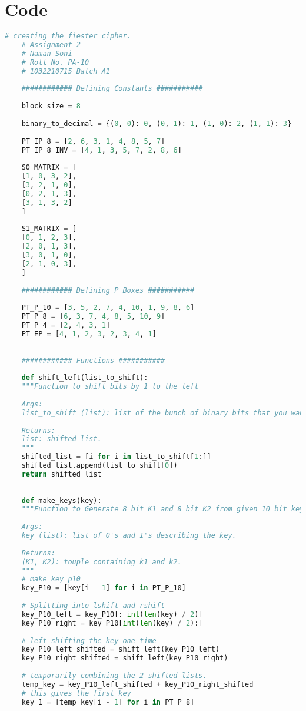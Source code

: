 \documentclass{article}
\begin{document}
\section{\textbf{Code}}
\begin{lstlisting}[language=python, caption={Input Code}]
	# creating the fiester cipher.
	# Assignment 2
	# Naman Soni
	# Roll No. PA-10
	# 1032210715 Batch A1
	
	############ Defining Constants ###########
	
	block_size = 8
	
	binary_to_decimal = {(0, 0): 0, (0, 1): 1, (1, 0): 2, (1, 1): 3}
	
	PT_IP_8 = [2, 6, 3, 1, 4, 8, 5, 7]
	PT_IP_8_INV = [4, 1, 3, 5, 7, 2, 8, 6]
	
	S0_MATRIX = [
	[1, 0, 3, 2],
	[3, 2, 1, 0],
	[0, 2, 1, 3],
	[3, 1, 3, 2]
	]
	
	S1_MATRIX = [
	[0, 1, 2, 3],
	[2, 0, 1, 3],
	[3, 0, 1, 0],
	[2, 1, 0, 3],
	]
	
	############ Defining P Boxes ###########
	
	PT_P_10 = [3, 5, 2, 7, 4, 10, 1, 9, 8, 6]
	PT_P_8 = [6, 3, 7, 4, 8, 5, 10, 9]
	PT_P_4 = [2, 4, 3, 1]
	PT_EP = [4, 1, 2, 3, 2, 3, 4, 1]
	
	
	############ Functions ###########
	
	def shift_left(list_to_shift):
	"""Function to shift bits by 1 to the left
	
	Args:
	list_to_shift (list): list of the bunch of binary bits that you wanna shift to left. 
	
	Returns:
	list: shifted list.
	"""
	shifted_list = [i for i in list_to_shift[1:]]
	shifted_list.append(list_to_shift[0])
	return shifted_list
	
	
	def make_keys(key):
	"""Function to Generate 8 bit K1 and 8 bit K2 from given 10 bit key. 
	
	Args:
	key (list): list of 0's and 1's describing the key. 
	
	Returns:
	(K1, K2): touple containing k1 and k2. 
	"""
	# make key_p10
	key_P10 = [key[i - 1] for i in PT_P_10]
	
	# Splitting into lshift and rshift
	key_P10_left = key_P10[: int(len(key) / 2)]
	key_P10_right = key_P10[int(len(key) / 2):]
	
	# left shifting the key one time
	key_P10_left_shifted = shift_left(key_P10_left)
	key_P10_right_shifted = shift_left(key_P10_right)
	
	# temporarily combining the 2 shifted lists.
	temp_key = key_P10_left_shifted + key_P10_right_shifted
	# this gives the first key
	key_1 = [temp_key[i - 1] for i in PT_P_8]
	

\end{lstlisting}
\end{document}
